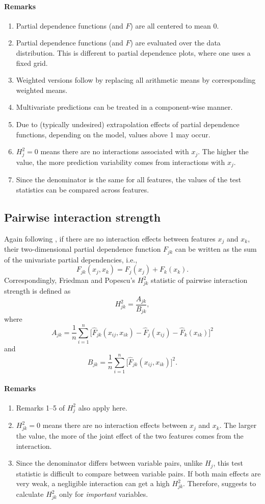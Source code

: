 \documentclass[]{article}
\begin{document}
\paragraph{Remarks}
\begin{enumerate}
	\item Partial dependence functions (and $F$) are all centered to mean 0.
	\item Partial dependence functions (and $F$) are evaluated over the data distribution. This is different to partial dependence plots, where one uses a fixed grid.
	\item Weighted versions follow by replacing all arithmetic means by corresponding weighted means.
	\item Multivariate predictions can be treated in a component-wise manner.
	\item Due to (typically undesired) extrapolation effects of partial dependence functions, depending on the model, values above 1 may occur.
	\item $H^2_j = 0$ means there are no interactions associated with $x_j$. The higher the value, the more prediction variability comes from interactions with $x_j$.
	\item Since the denominator is the same for all features, the values of the test statistics can be compared across features.
\end{enumerate}

\subsection{Pairwise interaction strength}
Again following \cite{friedman2008}, if there are no interaction effects between features $x_j$ and $x_k$, their two-dimensional partial dependence function $F_{jk}$ can be written as the sum of the univariate partial dependencies, i.e.,
$$
  F_{jk}(x_j, x_k) = F_j(x_j)+ F_k(x_k).
$$
Correspondingly, Friedman and Popescu's $H_{jk}^2$ statistic of pairwise interaction strength is defined as
$$
  H_{jk}^2 = \frac{A_{jk}}{B_{jk}},
$$
where 
$$
  A_{jk} = \frac{1}{n} \sum_{i = 1}^n\big[\hat F_{jk}(x_{ij}, x_{ik}) - \hat F_j(x_{ij}) - \hat F_k(x_{ik})\big]^2
$$
and
$$
  B_{jk} = \frac{1}{n} \sum_{i = 1}^n\big[\hat F_{jk}(x_{ij}, x_{ik})\big]^2.
$$
\paragraph{Remarks}
\begin{enumerate}
	\item Remarks 1--5 of $H^2_{j}$ also apply here.
	\item $H^2_{jk} = 0$ means there are no interaction effects between $x_j$ and $x_k$. The larger the value, the more of the joint effect of the two features comes from the interaction.
	\item Since the denominator differs between variable pairs, unlike $H_j$, this test statistic is difficult to compare between variable pairs. If both main effects are very weak, a negligible interaction can get a high $H^2_{jk}$. Therefore, \cite{friedman2008} suggests to calculate $H^2_{jk}$ only for {\em important} variables.
\end{enumerate}
\end{document}
